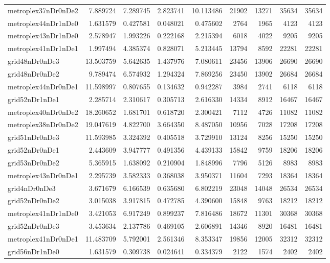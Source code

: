 \begin{longtable}{|l|r|r|r|r|r|r|r|r|}
metroplex37nDr0nDe2 & 7.889724 & 7.289745 & 2.823741 & 10.113486 & 21902 & 13271 & 35634 & 35634 \\
metroplex44nDr1nDe0 & 1.631579 & 0.427581 & 0.048021 & 0.475602 & 2764 & 1965 & 4123 & 4123 \\
metroplex43nDr1nDe0 & 2.578947 & 1.993226 & 0.222168 & 2.215394 & 6018 & 4022 & 9205 & 9205 \\
metroplex41nDr1nDe1 & 1.997494 & 4.385374 & 0.828071 & 5.213445 & 13794 & 8592 & 22281 & 22281 \\
grid48nDr0nDe3 & 13.503759 & 5.642635 & 1.437976 & 7.080611 & 23456 & 13906 & 26690 & 26690 \\
grid48nDr0nDe2 & 9.789474 & 6.574932 & 1.294324 & 7.869256 & 23450 & 13902 & 26684 & 26684 \\
metroplex44nDr0nDe1 & 11.598997 & 0.807655 & 0.134632 & 0.942287 & 3984 & 2741 & 6118 & 6118 \\
grid52nDr1nDe1 & 2.285714 & 2.310617 & 0.305713 & 2.616330 & 14334 & 8912 & 16467 & 16467 \\
metroplex40nDr0nDe2 & 18.260652 & 1.681701 & 0.618720 & 2.300421 & 7112 & 4726 & 11082 & 11082 \\
metroplex38nDr0nDe2 & 19.047619 & 4.822700 & 3.664350 & 8.487050 & 10956 & 7028 & 17208 & 17208 \\
grid51nDr0nDe3 & 11.593985 & 3.324392 & 0.405518 & 3.729910 & 13124 & 8256 & 15250 & 15250 \\
grid52nDr0nDe1 & 2.443609 & 3.947777 & 0.491356 & 4.439133 & 15842 & 9759 & 18206 & 18206 \\
grid53nDr0nDe2 & 5.365915 & 1.638092 & 0.210904 & 1.848996 & 7796 & 5126 & 8983 & 8983 \\
metroplex43nDr0nDe1 & 2.295739 & 3.582333 & 0.368038 & 3.950371 & 11604 & 7293 & 18364 & 18364 \\
grid4nDr0nDe3 & 3.671679 & 6.166539 & 0.635680 & 6.802219 & 23048 & 14048 & 26534 & 26534 \\
grid52nDr0nDe2 & 3.015038 & 3.917815 & 0.472785 & 4.390600 & 15848 & 9763 & 18212 & 18212 \\
metroplex41nDr1nDe0 & 3.421053 & 6.917249 & 0.899237 & 7.816486 & 18672 & 11301 & 30368 & 30368 \\
grid52nDr0nDe3 & 3.453634 & 2.137786 & 0.469105 & 2.606891 & 14346 & 8920 & 16481 & 16481 \\
metroplex41nDr0nDe1 & 11.483709 & 5.792001 & 2.561346 & 8.353347 & 19856 & 12005 & 32312 & 32312 \\
grid56nDr1nDe0 & 1.631579 & 0.309738 & 0.024641 & 0.334379 & 2122 & 1574 & 2402 & 2402 \\

\end{longtable}
